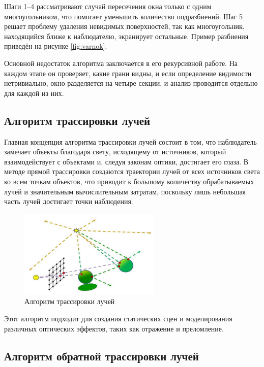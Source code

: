 Шаги 1–4 рассматривают случай пересечения окна только с одним многоугольником, что помогает уменьшить количество подразбиений. Шаг 5 решает проблему удаления невидимых поверхностей, так как многоугольник, находящийся ближе к наблюдателю, экранирует остальные. Пример разбиения приведён на рисунке \ref{fig:varnok}.

Основной недостаток алгоритма заключается в его рекурсивной работе. На каждом этапе он проверяет, какие грани видны, и если определение видимости нетривиально, окно разделяется на четыре секции, и анализ проводится отдельно для каждой из них.

\subsection{Алгоритм трассировки лучей}

Главная концепция алгоритма трассировки лучей состоит в том, что наблюдатель замечает объекты благодаря свету, исходящему от источников, который взаимодействует с объектами и, следуя законам оптики, достигает его глаза. В методе прямой трассировки создаются траектории лучей от всех источников света ко всем точкам объектов, что приводит к большому количеству обрабатываемых лучей и значительным вычислительным затратам, поскольку лишь небольшая часть лучей достигает точки наблюдения. 

\begin{figure}[h] 
	\centering
	\includegraphics[width=0.6\textwidth]{images/direct-ray-tracing.png}
	\caption{Алгоритм трассировки лучей} 
	\label{fig:direct-ray-tracing} 
\end{figure}

Этот алгоритм подходит для создания статических сцен и моделирования различных оптических эффектов, таких как отражение и преломление.

\subsection{Алгоритм обратной трассировки лучей}

